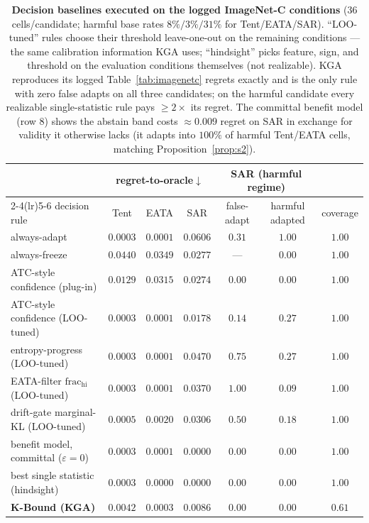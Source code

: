 \documentclass[conference]{IEEEtran}
\theoremstyle{plain}
\theoremstyle{definition}
\begin{document}
\begin{table}[t]\centering\small
\setlength{\tabcolsep}{4.5pt}
\begin{tabular}{lcccccc}
\toprule
 & \multicolumn{3}{c}{regret-to-oracle$\downarrow$} &
 \multicolumn{2}{c}{SAR (harmful regime)} & \\
\cmidrule(lr){2-4}\cmidrule(lr){5-6}
decision rule & Tent & EATA & SAR & false-adapt & harmful adapted & coverage \\
\midrule
always-adapt                          & $0.0003$ & $0.0001$ & $0.0606$ & $0.31$ & $1.00$ & $1.00$ \\
always-freeze                         & $0.0440$ & $0.0349$ & $0.0277$ & ---    & $0.00$ & $1.00$ \\
ATC-style confidence (plug-in)        & $0.0129$ & $0.0315$ & $0.0274$ & $0.00$ & $0.00$ & $1.00$ \\
ATC-style confidence (LOO-tuned)      & $0.0003$ & $0.0001$ & $0.0178$ & $0.14$ & $0.27$ & $1.00$ \\
entropy-progress (LOO-tuned)          & $0.0003$ & $0.0001$ & $0.0470$ & $0.75$ & $0.27$ & $1.00$ \\
EATA-filter $\mathrm{frac_{hi}}$ (LOO-tuned) & $0.0003$ & $0.0001$ & $0.0370$ & $1.00$ & $0.09$ & $1.00$ \\
drift-gate marginal-KL (LOO-tuned)    & $0.0005$ & $0.0020$ & $0.0306$ & $0.50$ & $0.18$ & $1.00$ \\
benefit model, committal ($\varepsilon{=}0$) & $0.0003$ & $0.0001$ & $\mathbf{0.0000}$ & $0.00$ & $0.00$ & $1.00$ \\
best single statistic (hindsight)     & $0.0003$ & $0.0000$ & $0.0000$ & $0.00$ & $0.00$ & $1.00$ \\
\textbf{K-Bound (KGA)}                & $0.0042$ & $0.0003$ & $0.0086$ & $\mathbf{0.00}$ & $\mathbf{0.00}$ & $0.61$ \\
\bottomrule
\end{tabular}
\caption{\textbf{Decision baselines executed on the logged ImageNet-C conditions}
($36$ cells/candidate; harmful base rates $8\%/3\%/31\%$ for Tent/EATA/SAR).
``LOO-tuned'' rules choose their threshold leave-one-out on the remaining
conditions --- the same calibration information \textsc{KGA} uses; ``hindsight''
picks feature, sign, and threshold on the evaluation conditions themselves (not
realizable). \textsc{KGA} reproduces its logged Table~\ref{tab:imagenetc} regrets
exactly and is the only rule with zero false adapts on all three candidates; on the
harmful candidate every realizable single-statistic rule pays $\ge2\times$ its
regret. The committal benefit model (row 8) shows the abstain band costs
$\approx0.009$ regret on SAR in exchange for validity it otherwise lacks
(it adapts into $100\%$ of harmful Tent/EATA cells, matching
Proposition~\ref{prop:s2}).}
\label{tab:decision-baselines}
\end{table}
\end{document}
